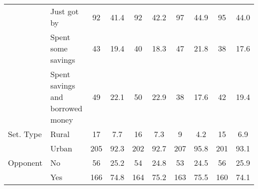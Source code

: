 \begin{table}[!htbp]
{\begin{tabular}[t]{llcccccccc}
 & Just got by & 92 & 41.4 & 92 & 42.2 & 97 & 44.9 & 95 & 44.0\\
 & Spent some savings & 43 & 19.4 & 40 & 18.3 & 47 & 21.8 & 38 & 17.6\\
 & Spent savings and
borrowed money & 49 & 22.1 & 50 & 22.9 & 38 & 17.6 & 42 & 19.4\\
Set. Type & Rural & 17 & 7.7 & 16 & 7.3 & 9 & 4.2 & 15 & 6.9\\
 & Urban & 205 & 92.3 & 202 & 92.7 & 207 & 95.8 & 201 & 93.1\\
Opponent & No & 56 & 25.2 & 54 & 24.8 & 53 & 24.5 & 56 & 25.9\\
 & Yes & 166 & 74.8 & 164 & 75.2 & 163 & 75.5 & 160 & 74.1\\
\bottomrule
\end{tabular}}
\end{table}
